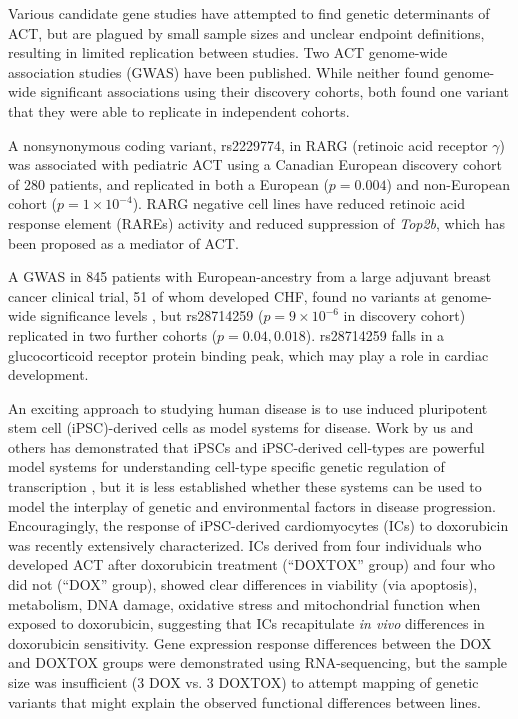 \documentclass{article}
\begin{document}
{Various candidate gene studies have attempted to find genetic determinants of ACT, but are plagued by small sample sizes and unclear endpoint definitions, resulting in limited replication between studies. 
Two ACT genome-wide association studies (GWAS) have been published. 
While neither found genome-wide significant associations using their discovery cohorts, both found one variant that they were able to replicate in independent cohorts. 

A nonsynonymous coding variant, rs2229774, in RARG (retinoic acid receptor $\gamma$) was associated with pediatric ACT using a Canadian European discovery cohort of 280 patients\cite{Aminkeng2015}, and replicated in both a European ($p=0.004$) and non-European cohort ($p=1 \times 10^{-4}$). 
RARG negative cell lines have reduced retinoic acid response element (RAREs) activity and reduced suppression of \emph{Top2b}\cite{Aminkeng2015}, which has been proposed as a mediator of ACT. 

A GWAS in 845 patients with European-ancestry from a large adjuvant breast cancer clinical trial, 51 of whom developed CHF, found no variants at genome-wide significance levels\cite{Schneider2016} , but rs28714259 ($p=9 \times 10^{-6}$ in discovery cohort) replicated in two further cohorts ($p=0.04, 0.018$). 
rs28714259 falls in a glucocorticoid receptor protein binding peak, which may play a role in cardiac development. 

An exciting approach to studying human disease is to use induced pluripotent stem cell (iPSC)-derived cells as model systems for disease. Work by us and others has demonstrated that iPSCs and iPSC-derived cell-types are powerful model systems for understanding cell-type specific genetic regulation of transcription \citep{Thomas2015,Burrows2016,Banovich091660,Kilpinen2017}, but it is less established whether these systems can be used to model the interplay of genetic and environmental factors in disease progression. Encouragingly, the response of iPSC-derived cardiomyocytes (ICs) to doxorubicin was recently extensively characterized\cite{Burridge2016}. ICs derived from four individuals who developed ACT after doxorubicin treatment (``DOXTOX'' group) and four who did not (``DOX'' group), showed clear differences in viability (via apoptosis), metabolism, DNA damage, oxidative stress and mitochondrial function when exposed to doxorubicin, suggesting that ICs recapitulate \emph{in vivo} differences in doxorubicin sensitivity. Gene expression response differences between the DOX and DOXTOX groups were demonstrated using RNA-sequencing, but the sample size was insufficient (3 DOX vs. 3 DOXTOX) to attempt mapping of genetic variants that might explain the observed functional differences between lines. 

}
\end{document}
